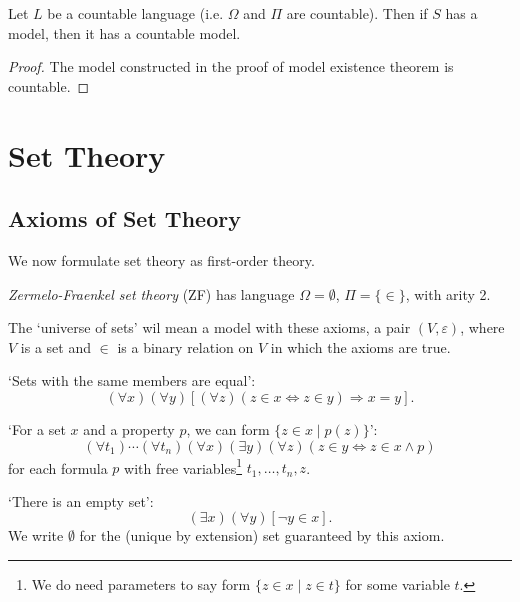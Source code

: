 \documentclass[a3paper, 10pt]{article}
\renewcommand{\vocab}[1]{\emph{#1}}
\begin{document}
\begin{multicols*}{5}
\begin{theorem}
  Let $L$ be a countable language (i.e. $\Omega$ and $\Pi$ are countable).
  Then if $S$ has a model, then it has a countable model.
\end{theorem}
\begin{proof}
  The model constructed in the proof of model existence theorem is countable.
\end{proof}


\section{Set Theory}

\subsection{Axioms of Set Theory}

We now formulate set theory as first-order theory.

\begin{definition}
  \vocab{Zermelo-Fraenkel set theory} (ZF) has language $\Omega = \emptyset$, $\Pi = \{\in \}$, with arity 2.
\end{definition}

The `universe of sets' wil mean a model with these axioms, a pair $(V, \varepsilon)$, where $V$ is a set and $\in$ is a binary relation on $V$ in which the axioms are true. 

\begin{axiom}
  `Sets with the same members are equal':
  $$
  (\forall x)(\forall y)[(\forall z)(z \in x \Leftrightarrow z \in y) \Rightarrow x= y].
  $$
\end{axiom}

\begin{axiom}
`For a set $x$ and a property $p$, we can form $\{z \in x \mid p(z)\}$':
$$
(\forall t_1)\cdots (\forall t_n) (\forall x)(\exists y)(\forall z)(z \in y \Leftrightarrow z \in x \land p)
$$
for each formula $p$ with free variables\footnote{We do need parameters to say form $\{z \in x \mid z \in t\}$ for some variable $t$.} $t_1, \dots, t_n, z$.
\end{axiom}

\begin{axiom}
  `There is an empty set':
  $$
  (\exists x) (\forall y)[\lnot y \in x].
  $$
  We write $\emptyset$ for the (unique by extension) set guaranteed by this axiom.
\end{axiom}


\end{multicols*}
\end{document}
